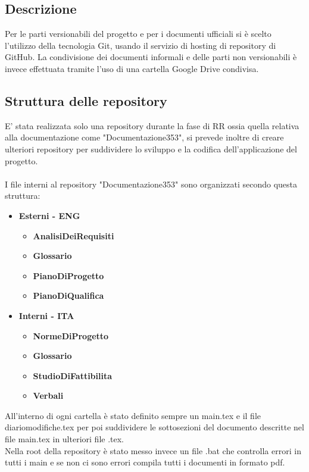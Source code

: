 \documentclass[NormeDiProgetto.tex]{subfiles}
\begin{document}
	\subsection{Descrizione}
	Per le parti versionabili del progetto e per i documenti ufficiali si è scelto l'utilizzo della tecnologia Git, usando il servizio di hosting di repository di GitHub.
	La condivisione dei documenti informali e delle parti non versionabili è invece effettuata tramite l'uso di una cartella Google Drive condivisa.
	
	\subsection{Struttura delle repository}
	E' stata realizzata solo una repository durante la fase di RR ossia quella relativa alla documentazione come "Documentazione353", si prevede inoltre di creare ulteriori repository per suddividere lo sviluppo e la codifica dell'applicazione del progetto. \\\\
	I file interni al repository "Documentazione353" sono organizzati secondo questa struttura:
	\begin{itemize}
		\item \textbf{Esterni - ENG}
				\begin{itemize}
				\item \textbf{AnalisiDeiRequisiti}
				\item \textbf{Glossario}
				\item \textbf{PianoDiProgetto}
				\item \textbf{PianoDiQualifica}
			\end{itemize}
		\item \textbf{Interni - ITA}
				\begin{itemize}
					\item \textbf{NormeDiProgetto}
					\item \textbf{Glossario}
					\item \textbf{StudioDiFattibilita}
					\item \textbf{Verbali}
				\end{itemize}		
	\end{itemize}	
	All'interno di ogni cartella è stato definito sempre un main.tex e il file diariomodifiche.tex per poi suddividere le sottosezioni del documento descritte nel file main.tex in ulteriori file .tex.\\
	Nella root della repository è stato messo invece un file .bat che controlla errori in tutti i main e se non ci sono errori compila tutti i documenti in formato pdf.
	
\end{document}
